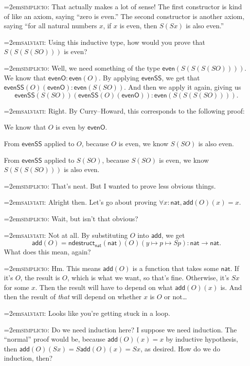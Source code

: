 \documentclass[11pt,paper=letter]{scrartcl}
\renewcommand{\sf}{\mathsf}
\newcommand{\simp}{\vspace{0.5em}\noindent\hangindent=2em\textsc{simplicio:} }
\newcommand{\salv}{\vspace{0.5em}\noindent\hangindent=2em\textsc{salviati:} }
\begin{document}
\simp That actually makes a lot of sense! The first constructor is kind of like an axiom, saying ``zero is even.'' The second constructor is another axiom, saying ``for all natural numbers $x$, if $x$ is even, then $S(Sx)$ is also even.''

\salv Using this inductive type, how would you prove that $S(S(S(SO)))$ is even?

\simp Well, we need something of the type $\sf{even}(S(S(S(SO))))$. We know that $\sf{evenO} : \sf{even}(O)$. By applying $\sf{evenSS}$, we get that $\sf{evenSS}(O)(\sf{evenO}) : \sf{even}(S(SO))$. And then we apply it again, giving us \[
  \sf{evenSS}(
    S(SO))(
    \sf{evenSS}(O)(\sf{evenO})
  ) : \sf{even}(S(S(S(SO)))).
\]

\salv Right. By Curry--Howard, this corresponds to the following proof:
\begin{itemthin}
\item We know that $O$ is even by $\sf{evenO}$.
\item From $\sf{evenSS}$ applied to $O$, because $O$ is even, we know $S(SO)$ is also even.
\item From $\sf{evenSS}$ applied to $S(SO)$, because $S(SO)$ is even, we know $S(S(S(SO)))$ is also even.
\end{itemthin}

\simp That's neat. But I wanted to prove less obvious things.

\salv Alright then. Let's go about proving $\forall x: \sf{nat}, \sf{add}(O)(x) = x$.

\simp Wait, but isn't that obvious?

\salv Not at all. By substituting $O$ into $\sf{add}$, we get \[
  \sf{add}(O)
  = \sf{ndestruct}_\sf{nat}(\sf{nat})(O)(y \mapsto p \mapsto Sp): \sf{nat} \to \sf{nat}.
\]
What does this mean, again?

\simp Hm. This means $\sf{add}(O)$ is a function that takes some $\sf{nat}$. If it's $O$, the result is $O$, which is what we want, so that's fine. Otherwise, it's $Sx$ for some $x$. Then the result will have to depend on what $\sf{add}(O)(x)$ is. And then the result of \emph{that} will depend on whether $x$ is $O$ or not\dots

\salv Looks like you're getting stuck in a loop.

\simp Do we need induction here? I suppose we need induction. The ``normal'' proof would be, because $\sf{add}(O)(x) = x$ by inductive hypothesis, then $\sf{add}(O)(Sx) = S\sf{add}(O)(x) = Sx$, as desired. How do we do induction, then?
\end{document}
